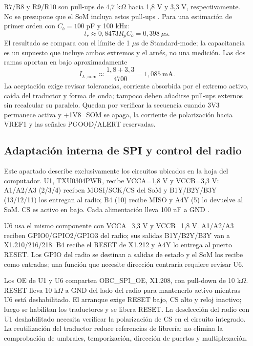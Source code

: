 \documentclass[11pt,letterpaper]{article}
\begin{document}
R7/R8 y R9/R10 son pull-ups de 4,7 k$\Omega$ hacia 1,8 V y 3,3 V, respectivamente. No se presupone que el SoM incluya estos pull-ups \cite{verdinguide}. Para una estimación de primer orden con $C_b=100$ pF y 100 kHz:
\begin{equation}
t_r\approx0,8473R_pC_b=0,398\ \mu\mathrm{s}.
\end{equation}
El resultado se compara con el límite de 1 $\mu$s de Standard-mode; la capacitancia es un supuesto que incluye ambos extremos y el arnés, no una medición. Las dos ramas aportan en bajo aproximadamente
\begin{equation}
I_{L,\mathrm{nom}}\approx\frac{1,8+3,3}{4700}=1,085\ \mathrm{mA}.
\end{equation}
La aceptación exige revisar tolerancias, corriente absorbida por el extremo activo, caída del traductor y forma de onda; tampoco deben añadirse pull-ups externos sin recalcular su paralelo. Quedan por verificar la secuencia cuando 3V3 permanece activa y +1V8\_SOM se apaga, la corriente de polarización hacia VREF1 y las señales PGOOD/ALERT reservadas.

\subsection{Adaptación interna de SPI y control del radio}
Este apartado describe exclusivamente los circuitos ubicados en la hoja del computador. U1, TXU0304PWR, recibe VCCA=1,8 V y VCCB=3,3 V: A1/A2/A3 (2/3/4) reciben MOSI/SCK/CS del SoM y B1Y/B2Y/B3Y (13/12/11) los entregan al radio; B4 (10) recibe MISO y A4Y (5) lo devuelve al SoM. CS es activo en bajo. Cada alimentación lleva 100 nF a GND \cite{txu0304}.

U6 usa el mismo componente con VCCA=3,3 V y VCCB=1,8 V. A1/A2/A3 reciben GPIO0/GPIO2/GPIO3 del radio; sus salidas B1Y/B2Y/B3Y van a X1.210/216/218. B4 recibe el RESET de X1.212 y A4Y lo entrega al puerto RESET. Los GPIO del radio se destinan a salidas de estado y el SoM los recibe como entradas; una función que necesite dirección contraria requiere revisar U6.

Los OE de U1 y U6 comparten OBC\_SPI\_OE, X1.208, con pull-down de 10 k$\Omega$. RESET lleva 10 k$\Omega$ a GND del lado del radio para mantenerlo activo mientras U6 está deshabilitado. El arranque exige RESET bajo, CS alto y reloj inactivo; luego se habilitan los traductores y se libera RESET. La deselección del radio con U1 deshabilitado necesita verificar la polarización de CS en el circuito integrado. La reutilización del traductor reduce referencias de librería; no elimina la comprobación de umbrales, temporización, dirección de puertos y multiplexación.
\end{document}
